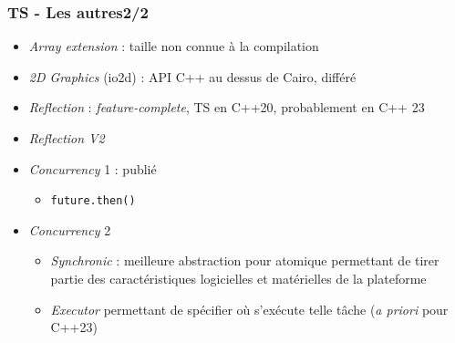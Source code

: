 \documentclass[C++.tex]{subfiles}
\begin{document}
\begin{frame}
	\frametitle{TS - Les autres\titlehfill{}2/2}
	\begin{itemize}
		\item \textit{Array extension} : taille non connue à la compilation
		\item \textit{2D Graphics} (io2d) : API C++ au dessus de Cairo, différé


		\item \textit{Reflection} : \textit{feature-complete}, TS en \og C++20\fg{}, probablement en C++ 23


		\item \textit{Reflection V2}

		\item \textit{Concurrency} 1 : publié
		\begin{itemize}
			\item \lstinline|future.then()|
		\end{itemize}
		\item \textit{Concurrency} 2
		\begin{itemize}
			\item \textit{Synchronic} : meilleure abstraction pour atomique permettant de tirer partie des caractéristiques logicielles et matérielles de la plateforme
			\item \textit{Executor} permettant de spécifier où s'exécute telle tâche (\textit{a priori} pour C++23)
		\end{itemize}
	\end{itemize}
\end{frame}
\end{document}
